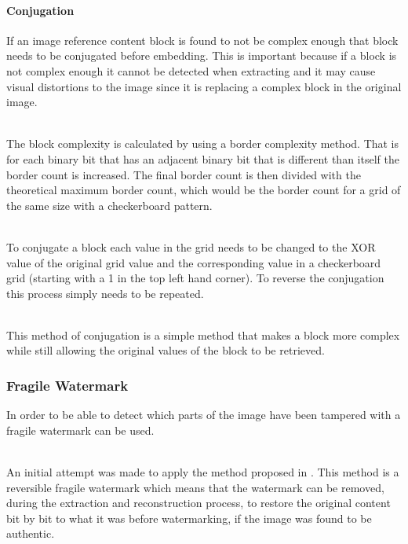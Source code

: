 \documentclass[12pt]{article}
\begin{document}
\paragraph{Conjugation}
If an image reference content block is found to not be complex enough that block needs to be conjugated before embedding.
This is important because if a block is not complex enough it cannot be detected when extracting and it may cause visual distortions to the image since it is replacing a complex block in the original image.

\hspace{0pt} \\
The block complexity is calculated by using a border complexity method. \cite{beaullieubpcs}
That is for each binary bit that has an adjacent binary bit that is different than itself the border count is increased. 
The final border count is then divided with the theoretical maximum border count, which would be the border count for a grid of the same size with a checkerboard pattern.

\hspace{0pt} \\
To conjugate a block each value in the grid needs to be changed to the XOR value of the original grid value and the corresponding value in a checkerboard grid (starting with a 1 in the top left hand corner).
To reverse the conjugation this process simply needs to be repeated.

\hspace{0pt} \\
This method of conjugation is a simple method that makes a block more complex while still allowing the original values of the block to be retrieved.

\subsubsection{Fragile Watermark}
\label{impFragileWatermark}
In order to be able to detect which parts of the image have been tampered with a fragile watermark can be used.

\hspace{0pt} \\
An initial attempt was made to apply the method proposed in \cite{tian2002wavelet}.
This method is a reversible fragile watermark which means that the watermark can be removed, during the extraction and reconstruction process, to restore the original content bit by bit to what it was before watermarking, if the image was found to be authentic.
\end{document}

